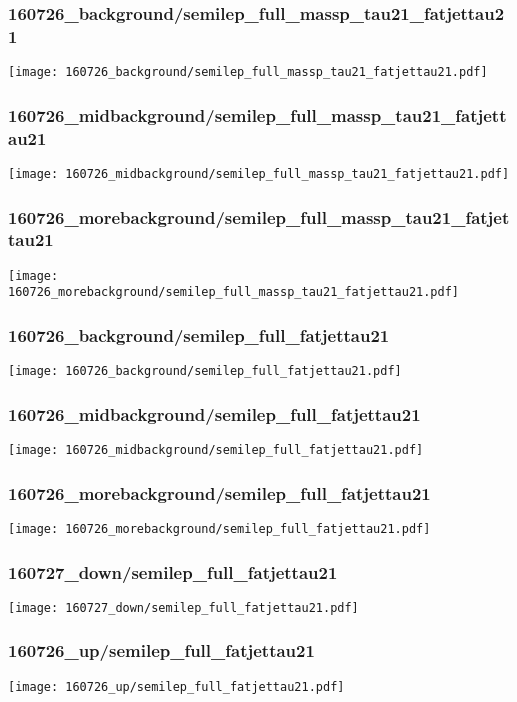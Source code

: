 \begin{frame}
   \frametitle{\small 160726\_background/semilep\_full\_massp\_tau21\_fatjettau21}
   \centering
   \texttt{[image: 160726\_background/semilep\_full\_massp\_tau21\_fatjettau21.pdf]}
\end{frame}

\begin{frame}
   \frametitle{\small 160726\_midbackground/semilep\_full\_massp\_tau21\_fatjettau21}
   \centering
   \texttt{[image: 160726\_midbackground/semilep\_full\_massp\_tau21\_fatjettau21.pdf]}
\end{frame}

\begin{frame}
   \frametitle{\small 160726\_morebackground/semilep\_full\_massp\_tau21\_fatjettau21}
   \centering
   \texttt{[image: 160726\_morebackground/semilep\_full\_massp\_tau21\_fatjettau21.pdf]}
\end{frame}

\begin{frame}
   \frametitle{\small 160726\_background/semilep\_full\_fatjettau21}
   \centering
   \texttt{[image: 160726\_background/semilep\_full\_fatjettau21.pdf]}
\end{frame}

\begin{frame}
   \frametitle{\small 160726\_midbackground/semilep\_full\_fatjettau21}
   \centering
   \texttt{[image: 160726\_midbackground/semilep\_full\_fatjettau21.pdf]}
\end{frame}

\begin{frame}
   \frametitle{\small 160726\_morebackground/semilep\_full\_fatjettau21}
   \centering
   \texttt{[image: 160726\_morebackground/semilep\_full\_fatjettau21.pdf]}
\end{frame}

\begin{frame}
   \frametitle{\small 160727\_down/semilep\_full\_fatjettau21}
   \centering
   \texttt{[image: 160727\_down/semilep\_full\_fatjettau21.pdf]}
\end{frame}

\begin{frame}
   \frametitle{\small 160726\_up/semilep\_full\_fatjettau21}
   \centering
   \texttt{[image: 160726\_up/semilep\_full\_fatjettau21.pdf]}
\end{frame}

